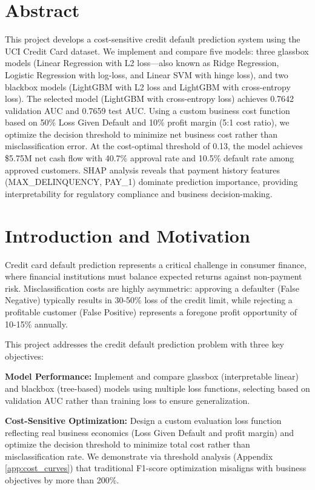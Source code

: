 \documentclass[12pt]{article}
\begin{document}
\section*{Abstract}
\noindent This project develops a cost-sensitive credit default prediction system using the UCI Credit Card dataset. We implement and compare five models: three glassbox models (Linear Regression with L2 loss—also known as Ridge Regression, Logistic Regression with log-loss, and Linear SVM with hinge loss), and two blackbox models (LightGBM with L2 loss and LightGBM with cross-entropy loss). The selected model (LightGBM with cross-entropy loss) achieves 0.7642 validation AUC and 0.7659 test AUC. Using a custom business cost function based on 50\% Loss Given Default and 10\% profit margin (5:1 cost ratio), we optimize the decision threshold to minimize net business cost rather than misclassification error. At the cost-optimal threshold of 0.13, the model achieves \$5.75M net cash flow with 40.7\% approval rate and 10.5\% default rate among approved customers. SHAP analysis reveals that payment history features (MAX\_DELINQUENCY, PAY\_1) dominate prediction importance, providing interpretability for regulatory compliance and business decision-making.

\section{Introduction and Motivation}

Credit card default prediction represents a critical challenge in consumer finance, where financial institutions must balance expected returns against non-payment risk. Misclassification costs are highly asymmetric: approving a defaulter (False Negative) typically results in 30-50\% loss of the credit limit, while rejecting a profitable customer (False Positive) represents a foregone profit opportunity of 10-15\% annually.

This project addresses the credit default prediction problem with three key objectives:

\textbf{Model Performance:} Implement and compare glassbox (interpretable linear) and blackbox (tree-based) models using multiple loss functions, selecting based on validation AUC rather than training loss to ensure generalization.

\textbf{Cost-Sensitive Optimization:} Design a custom evaluation loss function reflecting real business economics (Loss Given Default and profit margin) and optimize the decision threshold to minimize total cost rather than misclassification rate. We demonstrate via threshold analysis (Appendix \ref{app:cost_curves}) that traditional F1-score optimization misaligns with business objectives by more than 200\%.
\end{document}

